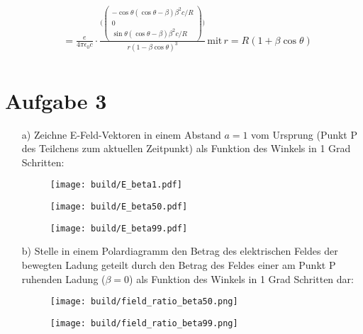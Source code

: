 \documentclass[11pt,a4paper]{article}
\begin{document}
\begin{itemize}
\begin{align*}
							&= \frac{e}{4 \pi \epsilon_{0} c} \cdot \frac{ \Biggl( \begin{pmatrix} -\cos{\theta} (\cos{\theta - \beta}) \beta^2c/R \\ 0 \\ \sin{\theta}(\cos{\theta} - \beta) \beta^2c/R \end{pmatrix} \Biggr) }{r (1 - \beta \cos{\theta})^3} \, \text{mit} \, r = R(1+\beta \cos{\theta}) \\
			\end{align*}
	\end{itemize}
    \section*{Aufgabe 3}
		\begin{itemize}
			\item[a)] Zeichne E-Feld-Vektoren in einem Abstand $a=1$ vom Ursprung (Punkt P des Teilchens zum aktuellen Zeitpunkt) als Funktion des Winkels in 1 Grad Schritten:
			\begin{figure}[ht]
				\centering
				\texttt{[image: build/E\_beta1.pdf]}
			\end{figure}

			\begin{figure}[ht]
				\centering
				\texttt{[image: build/E\_beta50.pdf]}
			\end{figure}

			\begin{figure}[ht]
				\centering
				\texttt{[image: build/E\_beta99.pdf]}
			\end{figure}

			\item[b)] Stelle in einem Polardiagramm den Betrag des elektrischen Feldes der bewegten Ladung geteilt durch den Betrag des Feldes 
			einer am Punkt P ruhenden Ladung ($\beta=0$) als Funktion des Winkels in 1 Grad Schritten dar:
			\begin{figure}[ht]
				\centering
				\texttt{[image: build/field\_ratio\_beta50.png]}
			\end{figure}

			\begin{figure}[ht]
				\centering
				\texttt{[image: build/field\_ratio\_beta99.png]}
			\end{figure}

		\end{itemize}
\end{document}
